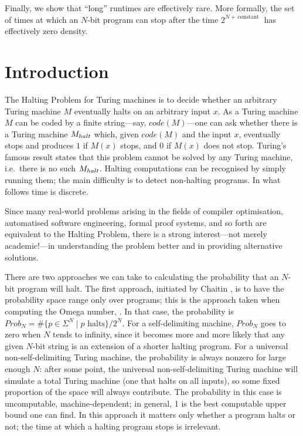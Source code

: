 \documentclass[12pt,twoside,openright]{report}
\begin{document}
Finally, we show that ``long'' runtimes are effectively rare. More formally, the set of times at which an $N$-bit program can stop after the time $2^{N +\,\mbox{constant }}$  has effectively zero density.

\section{Introduction}

The Halting Problem for Turing machines is to decide whether an arbitrary Turing machine $M$ eventually halts on an arbitrary input $x$. As a Turing machine $M$ can be coded by a finite string---say, $code(M)$---one can ask whether there is  a Turing machine $M_{\footnotesize halt}$ which, given  $code(M)$ and the input $x$, eventually stops and produces $1$ if $M(x)$ stops,  and $0$ if $M(x)$ does not stop. Turing's famous result states that this problem cannot be solved by any Turing machine, i.e.~there is no such  $M_{\footnotesize halt}$. Halting computations can be recognised by simply running them; the main difficulty is to detect non-halting programs. In what follows time is discrete.

Since many real-world problems arising in the fields of compiler optimisation, automatised software engineering, formal proof systems, and so forth are equivalent to the Halting Problem, there is a strong interest---not merely academic!---in understanding the problem better and in providing alternative solutions.

There are two approaches we can take to calculating the probability that an $N$-bit program will halt.  The first approach, initiated by Chaitin \cite{Chaitin1975},  is to have the probability space range only over programs; this is the approach taken when computing the Omega number, \cite{CDS,Calude}.  In that case, the probability is    $Prob_N = \#\{p \in \Sigma^N \mid p  \mbox{ halts}\}/2^N.$  For a self-delimiting machine, $Prob_N$ goes to zero when $N$ tends to infinity, since it becomes more and more likely that any given $N$-bit string is an extension of a shorter halting program.  For a universal non-self-delimiting Turing machine, the probability is always nonzero for large enough $N$: after some point, the  universal non-self-delimiting Turing machine will simulate a total Turing machine (one that halts on all inputs), so some fixed proportion of the space will always contribute.  The probability in this case is uncomputable, machine-dependent; in general, 1 is the best computable upper bound one can find. In this approach it matters only whether a program halts or not; the time at which a halting program stops is irrelevant.
\end{document}
